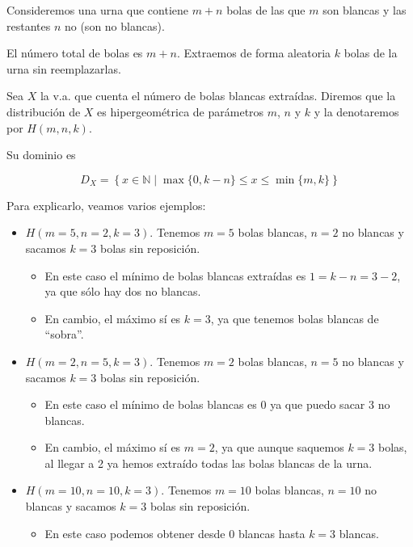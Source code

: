 \documentclass[
  letterpaper,
  DIV=11,
  numbers=noendperiod]{scrreprt}
\providecommand{\tightlist}{%
  \setlength{\itemsep}{0pt}\setlength{\parskip}{0pt}}\usepackage{longtable,booktabs,array}
\begin{document}
Consideremos una urna que contiene \(m+n\) bolas de las que \(m\) son
blancas y las restantes \(n\) no (son no blancas).

El número total de bolas es \(m+n\). Extraemos de forma aleatoria \(k\)
bolas de la urna sin reemplazarlas.

Sea \(X\) la v.a. que cuenta el número de bolas blancas extraídas.
Diremos que la distribución de \(X\) es hipergeométrica de parámetros
\(m\), \(n\) y \(k\) y la denotaremos por \(H(m,n,k)\).

Su dominio es

\[D_X=\left\{x\in\mathbb{N}\mid \max\{0,k-n\}\leq  x \leq \min\{m,k\}\right\}\]

Para explicarlo, veamos varios ejemplos:

\begin{itemize}
\tightlist
\item
  \(H(m=5,n=2,k=3)\). Tenemos \(m=5\) bolas blancas, \(n=2\) no blancas
  y sacamos \(k=3\) bolas sin reposición.

  \begin{itemize}
  \tightlist
  \item
    En este caso el mínimo de bolas blancas extraídas es \(1=k-n=3-2\),
    ya que sólo hay dos no blancas.
  \item
    En cambio, el máximo sí es \(k=3\), ya que tenemos bolas blancas de
    ``sobra''.
  \end{itemize}
\item
  \(H(m=2,n=5,k=3)\). Tenemos \(m=2\) bolas blancas, \(n=5\) no blancas
  y sacamos \(k=3\) bolas sin reposición.

  \begin{itemize}
  \tightlist
  \item
    En este caso el mínimo de bolas blancas es \(0\) ya que puedo sacar
    3 no blancas.
  \item
    En cambio, el máximo sí es \(m=2\), ya que aunque saquemos \(k=3\)
    bolas, al llegar a 2 ya hemos extraído todas las bolas blancas de la
    urna.
  \end{itemize}
\item
  \(H(m=10,n=10,k=3)\). Tenemos \(m=10\) bolas blancas, \(n=10\) no
  blancas y sacamos \(k=3\) bolas sin reposición.

  \begin{itemize}
  \tightlist
  \item
    En este caso podemos obtener desde \(0\) blancas hasta \(k=3\)
    blancas.
  \end{itemize}
\end{itemize}
\end{document}
